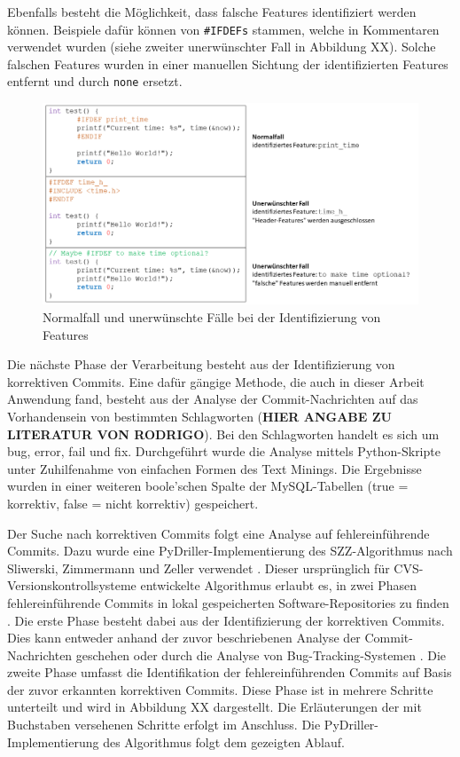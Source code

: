 Ebenfalls besteht die Möglichkeit, dass \glqq falsche\grqq{} Features identifiziert werden können. Beispiele dafür können von \texttt{\#IFDEFs} stammen, welche in Kommentaren verwendet wurden (siehe zweiter unerwünschter Fall in Abbildung XX). Solche falschen Features wurden in einer manuellen Sichtung der identifizierten Features entfernt und durch \texttt{none} ersetzt.

\begin{figure}[]
    \centering
    \includegraphics[width=\textwidth]{images/Features}
    \caption{Normalfall und unerwünschte Fälle bei der Identifizierung von Features\label{fig:feat}}
\end{figure}

Die nächste Phase der Verarbeitung besteht aus der Identifizierung von korrektiven Commits. Eine dafür gängige Methode, die auch in dieser Arbeit Anwendung fand, besteht aus der Analyse der Commit-Nachrichten auf das Vorhandensein von bestimmten Schlagworten (\textbf{HIER ANGABE ZU LITERATUR VON RODRIGO}). Bei den Schlagworten handelt es sich um \glqq bug\grqq, \glqq error\grqq, \glqq fail\grqq{} und \glqq fix\grqq. Durchgeführt wurde die Analyse mittels Python-Skripte unter Zuhilfenahme von einfachen Formen des Text Minings. Die Ergebnisse wurden in einer weiteren boole'schen Spalte der MySQL-Tabellen (true = korrektiv, false = nicht korrektiv) gespeichert.

Der Suche nach korrektiven Commits folgt eine Analyse auf fehlereinführende Commits. Dazu wurde eine PyDriller-Implementierung des SZZ-Algorithmus nach Sliwerski, Zimmermann und Zeller verwendet \cite{Sliwerski2005}. Dieser ursprünglich für CVS-Versionskontrollsysteme entwickelte Algorithmus erlaubt es, in zwei Phasen fehlereinführende Commits in lokal gespeicherten Software-Repositories zu finden \cite{Borg2019}. Die erste Phase besteht dabei aus der Identifizierung der korrektiven Commits. Dies kann entweder anhand der zuvor beschriebenen Analyse der Commit-Nachrichten geschehen oder durch die Analyse von Bug-Tracking-Systemen \cite{Borg2019}. Die zweite Phase umfasst die Identifikation der fehlereinführenden Commits auf Basis der zuvor erkannten korrektiven Commits. Diese Phase ist in mehrere Schritte unterteilt und wird in Abbildung XX dargestellt. Die Erläuterungen der mit Buchstaben versehenen Schritte erfolgt im Anschluss. Die PyDriller-Implementierung des Algorithmus folgt dem gezeigten Ablauf.

